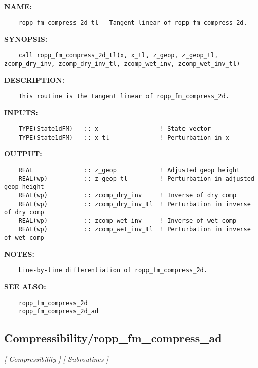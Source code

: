 \label{ch:robo20}
\label{ch:Compressibility_ropp_fm_compress_2d_tl}
\textbf{NAME:}\hspace{0.08in}\begin{Verbatim}
    ropp_fm_compress_2d_tl - Tangent linear of ropp_fm_compress_2d.
\end{Verbatim}
\textbf{SYNOPSIS:}\hspace{0.08in}\begin{Verbatim}
    call ropp_fm_compress_2d_tl(x, x_tl, z_geop, z_geop_tl, zcomp_dry_inv, zcomp_dry_inv_tl, zcomp_wet_inv, zcomp_wet_inv_tl)
\end{Verbatim}
\textbf{DESCRIPTION:}\hspace{0.08in}\begin{Verbatim}
    This routine is the tangent linear of ropp_fm_compress_2d.
\end{Verbatim}
\textbf{INPUTS:}\hspace{0.08in}\begin{Verbatim}
    TYPE(State1dFM)   :: x                 ! State vector
    TYPE(State1dFM)   :: x_tl              ! Perturbation in x
\end{Verbatim}
\textbf{OUTPUT:}\hspace{0.08in}\begin{Verbatim}
    REAL              :: z_geop            ! Adjusted geop height
    REAL(wp)          :: z_geop_tl         ! Perturbation in adjusted geop height
    REAL(wp)          :: zcomp_dry_inv     ! Inverse of dry comp
    REAL(wp)          :: zcomp_dry_inv_tl  ! Perturbation in inverse of dry comp
    REAL(wp)          :: zcomp_wet_inv     ! Inverse of wet comp
    REAL(wp)          :: zcomp_wet_inv_tl  ! Perturbation in inverse of wet comp
\end{Verbatim}
\textbf{NOTES:}\hspace{0.08in}\begin{Verbatim}
    Line-by-line differentiation of ropp_fm_compress_2d.
\end{Verbatim}
\textbf{SEE ALSO:}\hspace{0.08in}\begin{Verbatim}
    ropp_fm_compress_2d
    ropp_fm_compress_2d_ad
\end{Verbatim}
\subsection{Compressibility/ropp\_fm\_compress\_ad}
\textsl{[ Compressibility ]}
\textsl{[ Subroutines ]}

